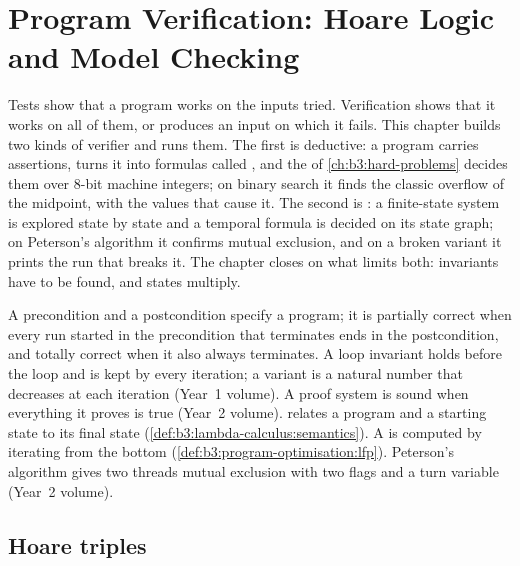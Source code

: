 \chapter{Program Verification: Hoare Logic and Model Checking}\label{ch:b3:program-verification}

Tests show that a program works on the inputs tried. Verification shows that it works on all of them, or produces an input on which it fails. This chapter builds two kinds of verifier and runs them. The first is deductive: a program carries assertions,  turns it into formulas called , and the  of \cref{ch:b3:hard-problems} decides them over 8-bit machine integers; on binary search it finds the classic overflow of the midpoint, with the values that cause it. The second is : a finite-state system is explored state by state and a temporal formula is decided on its state graph; on Peterson's algorithm it confirms mutual exclusion, and on a broken variant it prints the run that breaks it. The chapter closes on what limits both: invariants have to be found, and states multiply.

\begin{recall}
A precondition and a postcondition specify a program; it is partially correct when every run started in the precondition that terminates ends in the postcondition, and totally correct when it also always terminates. A loop invariant holds before the loop and is kept by every iteration; a variant is a natural number that decreases at each iteration (Year~1 volume). A proof system is sound when everything it proves is true (Year~2 volume).  relates a program and a starting state to its final state (\cref{def:b3:lambda-calculus:semantics}). A  is computed by iterating from the bottom (\cref{def:b3:program-optimisation:lfp}). Peterson's algorithm gives two threads mutual exclusion with two flags and a turn variable (Year~2 volume).
\end{recall}

\section{Hoare triples}\label{sec:b3:program-verification:hoare}

